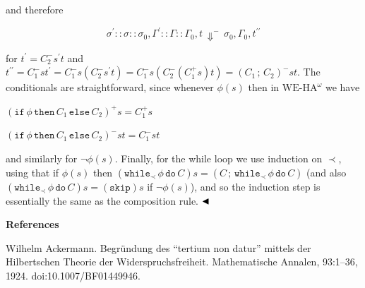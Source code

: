 \documentclass[10pt,a4paper]{article}
\begin{document}
and therefore\par
  
\par  \quad  \[{\sigma^{\prime}::\sigma::\sigma_{0}},{\Gamma^{\prime}::\Gamma::\Gamma_{0}},{t}\,{\Downarrow^{-}}\,{\sigma_{0}},{\Gamma_{0}},{t^{\prime\prime}}\]\quad  \quad  
  
for $t^{\prime}=C_{2}^{-}s^{\prime}t$ and $t^{\prime\prime}=C_{1}^{-}st^{\prime}=C_{1}^{-}s(C_{2}^{-}s^{\prime}t)=C_{1}^{-}s(C_{2}^{-}(C_{1}^{+}s)t)=({C_{1}}\,;\,{C_{2}})^{-}st$. The conditionals are straightforward, since whenever $\phi(s)$ then in $\mathrm{WE}\mbox{-}\mathrm{HA}^{\omega}$ we have\par
  
\par  \quad  $\displaystyle(\mathtt{if}\,{\phi}\,\mathtt{then}\,{C_{1}}\,\mathtt{else}\,{C_{2}})^{+}s$\quad  $\displaystyle=C_{1}^{+}s$\quad  \quad  
 
\par  \quad  $\displaystyle(\mathtt{if}\,{\phi}\,\mathtt{then}\,{C_{1}}\,\mathtt{else}\,{C_{2}})^{-}st$\quad  $\displaystyle=C_{1}^{-}st$\quad  \quad  
  
and similarly for $\neg\phi(s)$. Finally, for the while loop we use induction on $\prec$, using that if $\phi(s)$ then $(\mathtt{while}_{\prec}\,{\phi}\,\mathtt{do}\,{C})s=({C}\,;\,{\mathtt{while}_{\prec}\,{\phi}\,\mathtt{do}\,{C}})$ (and also $(\mathtt{while}_{\prec}\,{\phi}\,\mathtt{do}\,{C})s=(\mathtt{skip})s$ if $\neg\phi(s)$), and so the induction step is essentially the same as the composition rule. $\hfill\blacktriangleleft$\par
 
 
 
\par
 
 
 


 
\par\medskip\noindent\textbf{References}\par
  
\par\noindent  [1]  Wilhelm Ackermann.  Begründung des “tertium non datur” mittels der Hilbertschen Theorie der Widerspruchsfreiheit.  Mathematische Annalen, 93:1–36, 1924.  doi:10.1007/BF01449946.  
 
\end{document}
